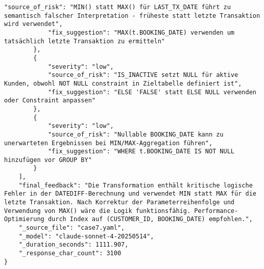 \begin{lstlisting}[caption={Ausgabe: Claude Sonnet 4 Anwendungsfall 7 Hauptdurchlauf},label={claude_case7_prompt1}]
            "source_of_risk": "MIN() statt MAX() für LAST_TX_DATE führt zu semantisch falscher Interpretation - früheste statt letzte Transaktion wird verwendet",
            "fix_suggestion": "MAX(t.BOOKING_DATE) verwenden um tatsächlich letzte Transaktion zu ermitteln"
        },
        {
            "severity": "low",
            "source_of_risk": "IS_INACTIVE setzt NULL für aktive Kunden, obwohl NOT NULL constraint in Zieltabelle definiert ist",
            "fix_suggestion": "ELSE 'FALSE' statt ELSE NULL verwenden oder Constraint anpassen"
        },
        {
            "severity": "low",
            "source_of_risk": "Nullable BOOKING_DATE kann zu unerwarteten Ergebnissen bei MIN/MAX-Aggregation führen",
            "fix_suggestion": "WHERE t.BOOKING_DATE IS NOT NULL hinzufügen vor GROUP BY"
        }
    ],
    "final_feedback": "Die Transformation enthält kritische logische Fehler in der DATEDIFF-Berechnung und verwendet MIN statt MAX für die letzte Transaktion. Nach Korrektur der Parameterreihenfolge und Verwendung von MAX() wäre die Logik funktionsfähig. Performance-Optimierung durch Index auf (CUSTOMER_ID, BOOKING_DATE) empfohlen.",
    "_source_file": "case7.yaml",
    "_model": "claude-sonnet-4-20250514",
    "_duration_seconds": 1111.907,
    "_response_char_count": 3100
}
\end{lstlisting}

